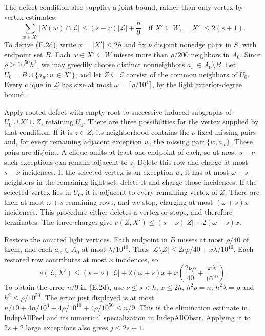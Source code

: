 \documentclass[english,11pt,a4paper]{article}
\newcounter{none}
\begin{document}
The defect condition also supplies a joint bound, rather than only vertex-by-vertex estimates: \[
\sum_{w\in X'}|N(w)\cap\mathcal L|
\le (s-\nu)|\mathcal L|+\frac n9
\quad\text{if }X'\subseteq W,\quad |X'|\le2(s+1).
\tag{E.2d}
\] To derive (E.2d), write \(x=|X'|\le2h\) and fix \(\nu\) disjoint nonedge pairs in \(S\), with endpoint set \(B\). Each \(w\in X'\subseteq W\) misses more than \(\rho/200\) neighbors in \(A_0\). Since \(\rho\ge10^{50}h^2\), we may greedily choose distinct nonneighbors \(a_w\in A_0\setminus B\). Let \(U_0=B\cup\{a_w:w\in X'\}\), and let \(Z\subseteq\mathcal L\) consist of the common neighbors of \(U_0\). Every clique in \(\mathcal L\) has size at most \(\omega=\lceil\rho/10^4\rceil\), by the light exterior-degree bound.

Apply rooted defect with empty root to successive induced subgraphs of \(U_0\cup X'\cup Z\), retaining \(U_0\). There are three possibilities for the vertex supplied by that condition. If it is \(z\in Z\), its neighborhood contains the \(\nu\) fixed missing pairs and, for every remaining adjacent exception \(w\), the missing pair \(\{w,a_w\}\). These pairs are disjoint. A clique omits at least one endpoint of each, so at most \(s-\nu\) such exceptions can remain adjacent to \(z\). Delete this row and charge at most \(s-\nu\) incidences. If the selected vertex is an exception \(w\), it has at most \(\omega+s\) neighbors in the remaining light set; delete it and charge those incidences. If the selected vertex lies in \(U_0\), it is adjacent to every remaining vertex of \(Z\). There are then at most \(\omega+s\) remaining rows, and we stop, charging at most \((\omega+s)x\) incidences. This procedure either deletes a vertex or stops, and therefore terminates. The three charges give \(e(Z,X')\le(s-\nu)|Z|+2(\omega+s)x\).

Restore the omitted light vertices. Each endpoint in \(B\) misses at most \(\rho/40\) of them, and each \(a_w\in A_0\) at most \(\lambda/10^{10}\). Thus \(|\mathcal L\setminus Z|\le2\nu\rho/40+x\lambda/10^{10}\). Each restored row contributes at most \(x\) incidences, so \[
e(\mathcal L,X')\le(s-\nu)|\mathcal L|
 +2(\omega+s)x+x\left(\frac{2\nu\rho}{40}+\frac{x\lambda}{10^{10}}\right).
\] To obtain the error \(n/9\) in (E.2d), use \(\nu\le s<h\), \(x\le2h\), \(h^2\rho=n\), \(h^2\lambda=\rho\) and \(h^2\le\rho/10^{50}\). The error just displayed is at most \(n/10+4n/10^4+4\rho/10^{10}+4\rho/10^{50}\le n/9\). This is the elimination estimate in {\ttfamily\small IndepAllPeel} and its numerical specialization in {\ttfamily\small IndepAllObst\discretionary{\hbox{\ensuremath{\hookrightarrow}}}{}{}r}. Applying it to \(2s+2\) large exceptions also gives \(j\le2s+1\).
\end{document}
